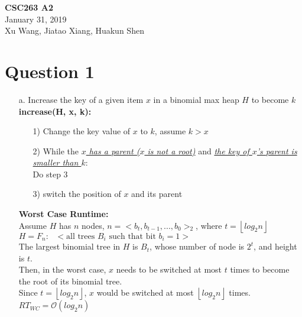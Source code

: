 \documentclass[10pt]{article}
\begin{document}
\noindent \textbf{CSC263 A2}\\
January 31, 2019\\
Xu Wang, Jiatao Xiang, Huakun Shen
\section*{Question 1}
\begin{enumerate}
\item[a.] Increase the key of a given item $x$ in a binomial max heap $H$ to
become $k$\\
\textbf{increase(H, x, k):}
\begin{enumerate}
\item[1)]Change the key value of $x$ to $k$, assume $k>x$
\item[2)]While the \underline{\textit{$x$ has a parent ($x$ is not a root)}} and \underline{\textit{the key of $x$'s parent is smaller than $k$}}:\\
Do step 3
\item[3)]switch the position of $x$ and its parent
\end{enumerate}
\textbf{Worst Case Runtime:}\\
Assume $H$ has $n$ nodes, $n=<b_t,b_{t-1},...,b_0>_2$,		where $t=\left\lfloor log_2n\right\rfloor$\\
$H=F_n:\text{ }<\text{all trees } B_i \text{ such that bit }b_i = 1>$\\
The largest binomial tree in $H$ is $B_t$, whose number of node is $2^t$, and height is $t$.\\
Then, in the worst case, $x$ needs to be switched at most $t$ times to become the root of its binomial tree.\\
Since $t=\left\lfloor log_2n\right\rfloor$, $x$ would be switched at most $\left\lfloor log_2n\right\rfloor$ times.\\
$RT_{WC}=\mathcal{O}(log_2n)$




\end{enumerate}
\end{document}
